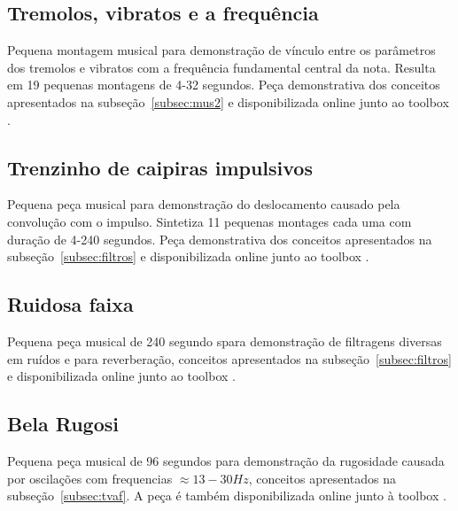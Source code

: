 \clearpage

\subsection{Tremolos, vibratos e a frequência}\label{ap:tremolos}
Pequena montagem musical para demonstração de vínculo entre os parâmetros dos tremolos e vibratos com a frequência fundamental central da nota. Resulta em 19 pequenas montagens de 4-32 segundos. Peça demonstrativa dos conceitos apresentados na subseção~\ref{subsec:mus2} e disponibilizada online junto ao toolbox \massa.\cite{MASSA}


\clearpage

\subsection{Trenzinho de caipiras impulsivos}\label{ap:trenzinho}
Pequena peça musical para demonstração do deslocamento causado pela convolução com o impulso. Sintetiza 11 pequenas montages cada uma com duração de 4-240 segundos. Peça demonstrativa dos conceitos apresentados na subseção~\ref{subsec:filtros} e disponibilizada online junto ao toolbox \massa.


\clearpage

\subsection{Ruidosa faixa}\label{ap:ruidosa}
Pequena peça musical de 240 segundo spara demonstração de filtragens diversas em ruídos e para reverberação, conceitos apresentados na subseção~\ref{subsec:filtros} e disponibilizada online junto ao toolbox \massa.\cite{MASSA}


\clearpage

\subsection{Bela Rugosi}\label{ap:bela}
Pequena peça musical de 96 segundos para demonstração da rugosidade causada por oscilações com frequencias $\approx 13-30 Hz$, conceitos apresentados na subseção~\ref{subsec:tvaf}. A peça é também disponibilizada online junto à toolbox \massa.\cite{MASSA}


